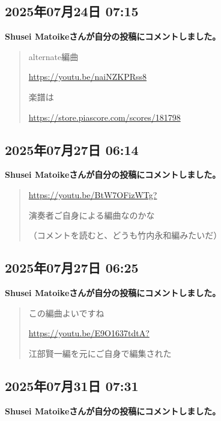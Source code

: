 \subsection*{2025年07月24日 07:15}

\textbf{Shusei Matoikeさんが自分の投稿にコメントしました。}

\begin{quote}
alternate編曲

\url{https://youtu.be/naiNZKPRss8}

楽譜は

\url{https://store.piascore.com/scores/181798}
\end{quote}

\subsection*{2025年07月27日 06:14}

\textbf{Shusei Matoikeさんが自分の投稿にコメントしました。}

\begin{quote}
\url{https://youtu.be/BtW7OFizWTg?}

演奏者ご自身による編曲なのかな

（コメントを読むと、どうも竹内永和編みたいだ）
\end{quote}

\subsection*{2025年07月27日 06:25}

\textbf{Shusei Matoikeさんが自分の投稿にコメントしました。}

\begin{quote}
この編曲よいですね

\url{https://youtu.be/E9O1637tdtA?}

江部賢一編を元にご自身で編集された
\end{quote}

\subsection*{2025年07月31日 07:31}

\textbf{Shusei Matoikeさんが自分の投稿にコメントしました。}

